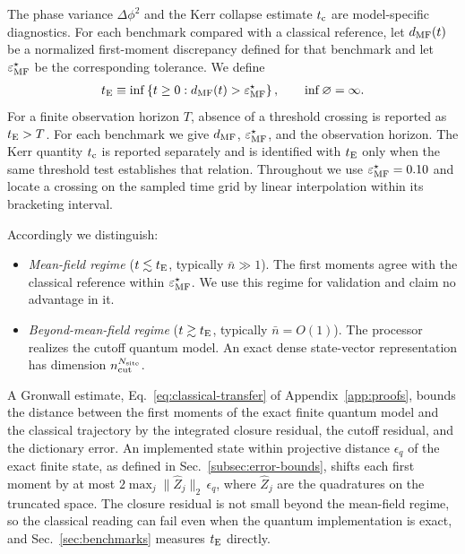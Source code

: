 \documentclass[pra,twocolumn,superscriptaddress,nofootinbib,floatfix]{revtex4-2}
\theoremstyle{remark}
\begin{document}
The phase variance \(\Delta\phi^2\) and the Kerr collapse estimate \(t_{\rm c}\) are model-specific diagnostics. For each benchmark compared with a classical reference, let \(d_{\rm MF}(t)\) be a normalized first-moment discrepancy defined for that benchmark and let \(\varepsilon_{\rm MF}^{\star}\) be the corresponding tolerance. We define
\begin{align}
t_{\rm E} \equiv \inf\left\{ t\geq0: d_{\rm MF}(t)>\varepsilon_{\rm MF}^{\star} \right\}, \qquad \inf\varnothing=\infty .
\label{eq:mean-field-validity-time}
\end{align}
For a finite observation horizon \(T\), absence of a threshold crossing is reported as \(t_{\rm E}>T\).
For each benchmark we give \(d_{\rm MF}\), \(\varepsilon_{\rm MF}^{\star}\), and the observation horizon. The Kerr quantity \(t_{\rm c}\) is reported separately and is identified with \(t_{\rm E}\) only when the same threshold test establishes that relation. Throughout we use \(\varepsilon_{\rm MF}^{\star}=0.10\) and locate a crossing on the sampled time grid by linear interpolation within its bracketing interval.

Accordingly we distinguish:
\begin{itemize}
\item \emph{Mean-field regime} (\(t\lesssim t_{\rm E}\), typically \(\bar n\gg1\)). The first moments agree with the classical reference within \(\varepsilon_{\rm MF}^{\star}\). We use this regime for validation and claim no advantage in it.
\item \emph{Beyond-mean-field regime} (\(t\gtrsim t_{\rm E}\), typically \(\bar n=O(1)\)). The processor realizes the cutoff quantum model. An exact dense state-vector representation has dimension \(n_{\rm cut}^{N_{\rm site}}\).
\end{itemize}

A Gronwall estimate, Eq.~\eqref{eq:classical-transfer} of Appendix~\ref{app:proofs}, bounds the distance between the first moments of the exact finite quantum model and the classical trajectory by the integrated closure residual, the cutoff residual, and the dictionary error. An implemented state within projective distance \(\epsilon_q\) of the exact finite state, as defined in Sec.~\ref{subsec:error-bounds}, shifts each first moment by at most \(2\max_j\|\hat Z_j\|_2\,\epsilon_q\), where \(\hat Z_j\) are the quadratures on the truncated space. The closure residual is not small beyond the mean-field regime, so the classical reading can fail even when the quantum implementation is exact, and Sec.~\ref{sec:benchmarks} measures \(t_{\rm E}\) directly.
\end{document}
